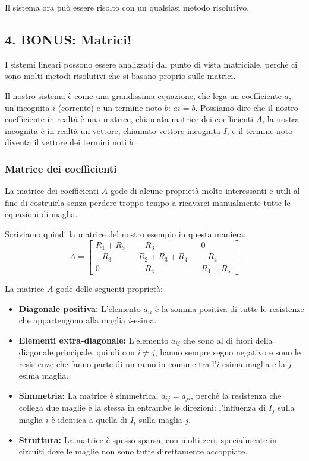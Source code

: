 Il sistema ora può essere risolto con un qualsiasi metodo risolutivo.

\subsection*{4. BONUS: Matrici!}

I sistemi lineari possono essere analizzati dal punto di vista matriciale, perchè ci sono molti metodi risolutivi che si basano proprio sulle matrici.

Il nostro sistema è come una grandissima equazione, che lega un coefficiente $a$, un'incognita $i$ (corrente) e un termine noto $b$: $ai = b$. Possiamo dire che il nostro coefficiente in realtà è una matrice, chiamata matrice dei coefficienti $A$, la nostra incognita è in realtà un vettore, chiamato vettore incognita $I$, e il termine noto diventa il vettore dei termini noti $b$.

\subsubsection*{Matrice dei coefficienti}

La matrice dei coefficienti $A$ gode di alcune proprietà molto interessanti e utili al fine di costruirla senza perdere troppo tempo a ricavarci manualmente tutte le equazioni di maglia.

Scriviamo quindi la matrice del nostro esempio in questa maniera:
\begin{equation}
    A = 
    \begin{bmatrix}
    R_1+R_3 && -R_3   && 0      \\
    -R_3    && R_2+R_3+R_4 && -R_4 \\
    0       && -R_4   && R_4+R_5
    \end{bmatrix}
\end{equation}

La matrice $A$ gode delle seguenti proprietà:
\begin{itemize}
    \item \textbf{Diagonale positiva:} L'elemento $a_{ii}$ è la somma positiva di tutte le resistenze che appartengono alla maglia $i$-esima.
    \item \textbf{Elementi extra-diagonale:} L'elemento $a_{ij}$ che sono al di fuori della diagonale principale, quindi con $i \neq j$, hanno sempre segno negativo e sono le resistenze che fanno parte di un ramo in comune tra l'$i$-esima maglia e la $j$-esima maglia.
    \item \textbf{Simmetria:} La matrice è simmetrica, $a_{ij}=a_{ji}$, perché la resistenza che collega due maglie è la stessa in entrambe le direzioni: l'influenza di $I_j$ sulla maglia $i$ è identica a quella di $I_i$ sulla maglia $j$.
    \item \textbf{Struttura:} La matrice è spesso sparsa, con molti zeri, specialmente in circuiti dove le maglie non sono tutte direttamente accoppiate.
\end{itemize}

